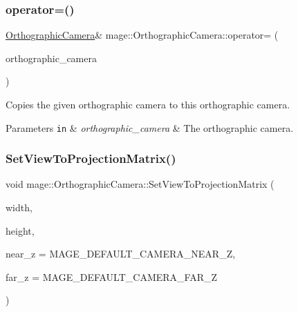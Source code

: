 \hypertarget{classmage_1_1_orthographic_camera_a8ea679c9b4c3d2c6aef40119dbf60921}{}\label{classmage_1_1_orthographic_camera_a8ea679c9b4c3d2c6aef40119dbf60921} 
\subsubsection{\texorpdfstring{operator=()}{operator=()}}
{\footnotesize\ttfamily \hyperlink{classmage_1_1_orthographic_camera}{Orthographic\+Camera}\& mage\+::\+Orthographic\+Camera\+::operator= (\begin{DoxyParamCaption}\item[{const \hyperlink{classmage_1_1_orthographic_camera}{Orthographic\+Camera} \&}]{orthographic\+\_\+camera }\end{DoxyParamCaption})\hspace{0.3cm}{\ttfamily [private]}}

Copies the given orthographic camera to this orthographic camera.


\begin{DoxyParams}[1]{Parameters}
\mbox{\tt in}  & {\em orthographic\+\_\+camera} & The orthographic camera. \\
\hline
\end{DoxyParams}
\hypertarget{classmage_1_1_orthographic_camera_a1ff2b3e4467049b978155d652a687c2d}{}\label{classmage_1_1_orthographic_camera_a1ff2b3e4467049b978155d652a687c2d} 
\subsubsection{\texorpdfstring{Set\+View\+To\+Projection\+Matrix()}{SetViewToProjectionMatrix()}}
{\footnotesize\ttfamily void mage\+::\+Orthographic\+Camera\+::\+Set\+View\+To\+Projection\+Matrix (\begin{DoxyParamCaption}\item[{float}]{width,  }\item[{float}]{height,  }\item[{float}]{near\+\_\+z = {\ttfamily MAGE\+\_\+DEFAULT\+\_\+CAMERA\+\_\+NEAR\+\_\+Z},  }\item[{float}]{far\+\_\+z = {\ttfamily MAGE\+\_\+DEFAULT\+\_\+CAMERA\+\_\+FAR\+\_\+Z} }\end{DoxyParamCaption})\hspace{0.3cm}{\ttfamily [private]}}

